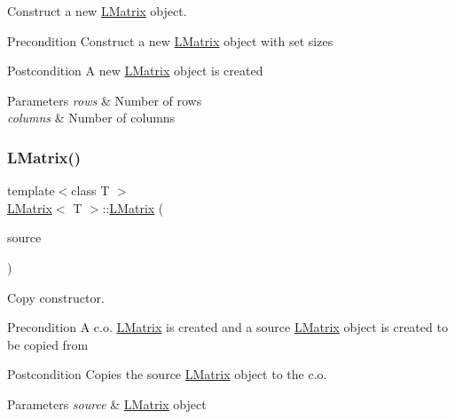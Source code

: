 Construct a new \mbox{\hyperlink{class_l_matrix}{L\+Matrix}} object. 

\begin{DoxyPrecond}{Precondition}
Construct a new \mbox{\hyperlink{class_l_matrix}{L\+Matrix}} object with set sizes 
\end{DoxyPrecond}
\begin{DoxyPostcond}{Postcondition}
A new \mbox{\hyperlink{class_l_matrix}{L\+Matrix}} object is created 
\end{DoxyPostcond}

\begin{DoxyParams}{Parameters}
{\em rows} & Number of rows \\
\hline
{\em columns} & Number of columns \\
\hline
\end{DoxyParams}
\mbox{\label{class_l_matrix_a0a4d56623c6c83d9fd2c3040e41429ae}} 
\subsubsection{\texorpdfstring{LMatrix()}{LMatrix()}\hspace{0.1cm}{\footnotesize\ttfamily [3/3]}}
{\footnotesize\ttfamily template$<$class T $>$ \\
\mbox{\hyperlink{class_l_matrix}{L\+Matrix}}$<$ T $>$\+::\mbox{\hyperlink{class_l_matrix}{L\+Matrix}} (\begin{DoxyParamCaption}\item[{const \mbox{\hyperlink{class_l_matrix}{L\+Matrix}}$<$ T $>$ \&}]{source }\end{DoxyParamCaption})}



Copy constructor. 

\begin{DoxyPrecond}{Precondition}
A c.\+o. \mbox{\hyperlink{class_l_matrix}{L\+Matrix}} is created and a source \mbox{\hyperlink{class_l_matrix}{L\+Matrix}} object is created to be copied from 
\end{DoxyPrecond}
\begin{DoxyPostcond}{Postcondition}
Copies the source \mbox{\hyperlink{class_l_matrix}{L\+Matrix}} object to the c.\+o. 
\end{DoxyPostcond}

\begin{DoxyParams}{Parameters}
{\em source} & \mbox{\hyperlink{class_l_matrix}{L\+Matrix}} object \\
\hline
\end{DoxyParams}
\mbox{\label{class_l_matrix_ab4289f015b6b154b0f396550c1975250}} 
